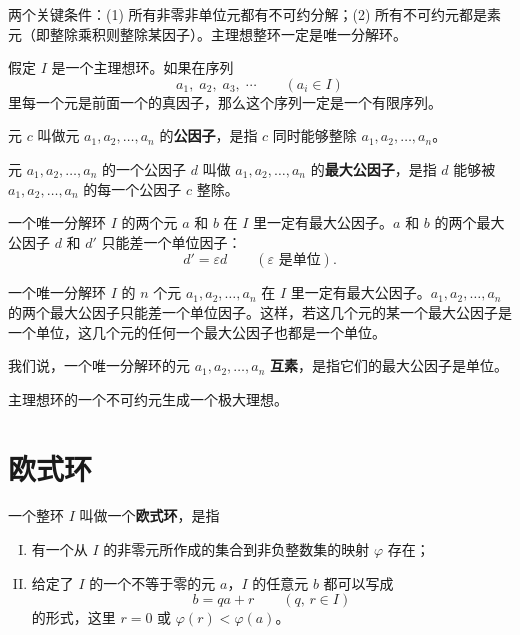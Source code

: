 \begin{note}[整环成为唯一分解环需要的条件]
两个关键条件：(1) 所有非零非单位元都有不可约分解；(2) 所有不可约元都是素元（即整除乘积则整除某因子）。主理想整环一定是唯一分解环。
\end{note}

\begin{lemma}[引理 1：有限序列判定]
假定 $I$ 是一个主理想环。如果在序列
\[
a_1,\;a_2,\;a_3,\;\cdots\qquad(a_i\in I)
\]
里每一个元是前面一个的真因子，那么这个序列一定是一个有限序列。
\end{lemma}

\begin{definition}[公因子与最大公因子]
元 $c$ 叫做元 $a_1,a_2,\ldots,a_n$ 的\textbf{公因子}，是指 $c$ 同时能够整除 $a_1,a_2,\ldots,a_n$。

元 $a_1,a_2,\ldots,a_n$ 的一个公因子 $d$ 叫做 $a_1,a_2,\ldots,a_n$ 的\textbf{最大公因子}，是指 $d$ 能够被 $a_1,a_2,\ldots,a_n$ 的每一个公因子 $c$ 整除。
\end{definition}

\begin{theorem}[定理 3：最大公因子与单位因子]
一个唯一分解环 $I$ 的两个元 $a$ 和 $b$ 在 $I$ 里一定有最大公因子。$a$ 和 $b$ 的两个最大公因子 $d$ 和 $d'$ 只能差一个单位因子：
\[
d'=\varepsilon d\qquad(\varepsilon\text{ 是单位}).
\]
\end{theorem}

\begin{corollary}
一个唯一分解环 $I$ 的 $n$ 个元 $a_1,a_2,\ldots,a_n$ 在 $I$ 里一定有最大公因子。$a_1,a_2,\ldots,a_n$ 的两个最大公因子只能差一个单位因子。这样，若这几个元的某一个最大公因子是一个单位，这几个元的任何一个最大公因子也都是一个单位。
\end{corollary}

\begin{definition}[互素]
我们说，一个唯一分解环的元 $a_1,a_2,\ldots,a_n$ \textbf{互素}，是指它们的最大公因子是单位。
\end{definition}

\begin{lemma}[引理 2：主理想环的不可约元生成极大理想]
主理想环的一个不可约元生成一个极大理想。
\end{lemma}

\section{欧式环}

\begin{definition}[欧式环]
一个整环 $I$ 叫做一个\textbf{欧式环}，是指
\begin{enumerate}[I.]
  \item 有一个从 $I$ 的非零元所作成的集合到非负整数集的映射 $\varphi$ 存在；
  \item 给定了 $I$ 的一个不等于零的元 $a$，$I$ 的任意元 $b$ 都可以写成
  \[
    b=qa+r\qquad(q,\,r\in I)
  \]
  的形式，这里 $r=0$ 或 $\varphi(r)<\varphi(a)$。
\end{enumerate}
\end{definition}

